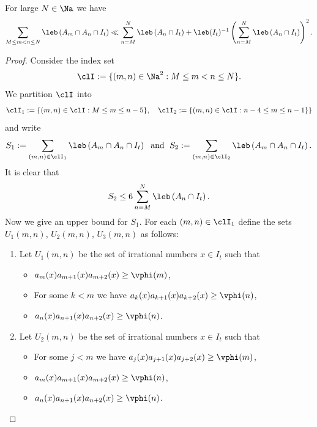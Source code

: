 \documentclass[12pt,a4paper]{amsart}
\begin{document}
\begin{lem01}\label{Lem:Divergence:02}
For large $N\in\Na$ we have
\begin{equation}\label{Eq:Lem:4.3}
\sum_{M\leq m< n \leq N} \leb\left(A_m\cap A_n\cap I_t\right)
\ll
\sum_{n=M}^N \leb\left( A_n\cap I_t \right)
+
\leb(I_t)^{-1} \left(\sum_{n=M}^N \leb\left( A_n\cap I_t \right) \right)^2.
\end{equation}
\end{lem01}
\begin{proof}
Consider the index set
\[
\clI:=\{(m,n)\in\Na^2: M\leq m< n \leq N\}.
\]
We partition $\clI$ into
\[
\clI_1:=\{(m,n)\in \clI: M\leq m \leq n - 5\}, 
\quad
\clI_2:=\{(m,n)\in \clI: n - 4\leq m \leq n-1 \}  \}
\]
and write
\[
S_1:=\sum_{(m,n)\in \clI_1} \leb\left(A_m\cap A_n\cap I_t\right)
\;\text{ and }\;
S_2:=\sum_{(m,n)\in \clI_2} \leb\left(A_m\cap A_n\cap I_t\right).
\]
It is clear that 
\[
S_2
\leq 
6
\sum_{n=M}^N \leb\left(A_n\cap I_t\right).
\]
Now we give an upper bound for $S_1$. For each $(m,n)\in \clI_1$ define the sets $U_1(m,n)$, $U_2(m,n)$, $U_3(m,n)$ as follows:
\begin{enumerate}[1.]
\item Let $U_1(m,n)$ be the set of irrational numbers $x\in I_t$ such that
\begin{itemize}
\item[•] $a_{m}(x)a_{m+1}(x) a_{m + 2}(x)\geq \vphi(m)$,
\item[•] For some $k<m$ we have $a_{k}(x)a_{k+1}(x) a_{k+2}(x)\geq \vphi(n)$,
\item[•] $a_{n}(x)a_{n+1}(x)a_{n+2}(x) \geq \vphi(n)$.
\end{itemize}

\item Let $U_2(m,n)$ be the set of irrational numbers $x\in I_t$ such that
\begin{itemize}
\item[•] For some $j<m$ we have $a_{j}(x)a_{j+1}(x)a_{j+2}(x) \geq \vphi(m)$,
\item[•] $a_{m}(x) a_{m + 1}(x) a_{m+2}(x) \geq \vphi(n)$,
\item[•] $a_n(x) a_{n + 1}(x)a_{n + 2}(x) \geq \vphi(n)$.
\end{itemize}


\end{enumerate}
\end{proof}
\end{document}
